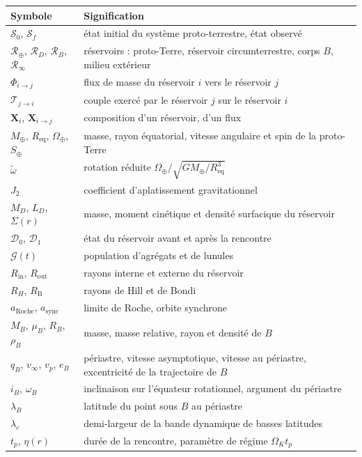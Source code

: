 \documentclass[11pt,a4paper,openany]{report}
\newcommand{\Mt}{M_{\oplus}}
\newcommand{\Req}{R_{\mathrm{eq}}}
\newcommand{\aR}{a_{\mathrm{Roche}}}
\newcommand{\RT}{\mathcal{R}_{\oplus}}
\newcommand{\RD}{\mathcal{R}_{D}}
\newcommand{\RB}{\mathcal{R}_{B}}
\newcommand{\Rinf}{\mathcal{R}_{\infty}}
\begin{document}
\small
\begin{longtable}{>{\raggedright\arraybackslash}p{3.2cm}>{\raggedright\arraybackslash}p{11.6cm}}
\toprule
\textbf{Symbole} & \textbf{Signification} \\
\midrule
\endhead
$\mathcal{S}_0$, $\mathcal{S}_f$ & état initial du système proto-terrestre, état observé \\
$\RT$, $\RD$, $\RB$, $\Rinf$ & réservoirs : proto-Terre, réservoir circumterrestre, corps $B$, milieu extérieur \\
$\Phi_{i\to j}$ & flux de masse du réservoir $i$ vers le réservoir $j$ \\
$\boldsymbol{\mathcal{T}}_{j\to i}$ & couple exercé par le réservoir $j$ sur le réservoir $i$ \\
$\mathbf{X}_i$, $\mathbf{X}_{i\to j}$ & composition d'un réservoir, d'un flux \\
$\Mt$, $\Req$, $\Omega_\oplus$, $S_\oplus$ & masse, rayon équatorial, vitesse angulaire et spin de la proto-Terre \\
$\tilde\omega$ & rotation réduite $\Omega_\oplus/\sqrt{G\Mt/\Req^3}$ \\
$J_2$ & coefficient d'aplatissement gravitationnel \\
$M_D$, $L_D$, $\Sigma(r)$ & masse, moment cinétique et densité surfacique du réservoir \\
$\mathcal{D}_0$, $\mathcal{D}_1$ & état du réservoir avant et après la rencontre \\
$\mathcal{G}(t)$ & population d'agrégats et de lunules \\
$R_{\mathrm{in}}$, $R_{\mathrm{out}}$ & rayons interne et externe du réservoir \\
$R_H$, $R_{\mathrm{B}}$ & rayons de Hill et de Bondi \\
$\aR$, $a_{\mathrm{sync}}$ & limite de Roche, orbite synchrone \\
$M_B$, $\mu_B$, $R_B$, $\rho_B$ & masse, masse relative, rayon et densité de $B$ \\
$q_B$, $v_\infty$, $v_p$, $e_B$ & périastre, vitesse asymptotique, vitesse au périastre, excentricité de la trajectoire de $B$ \\
$i_B$, $\omega_B$ & inclinaison sur l'équateur rotationnel, argument du périastre \\
$\lambda_B$ & latitude du point sous $B$ au périastre \\
$\lambda_c$ & demi-largeur de la bande dynamique de basses latitudes \\
$t_{p}$, $\eta(r)$ & durée de la rencontre, paramètre de régime $\Omega_Kt_{p}$ \\

\end{longtable}
\end{document}
